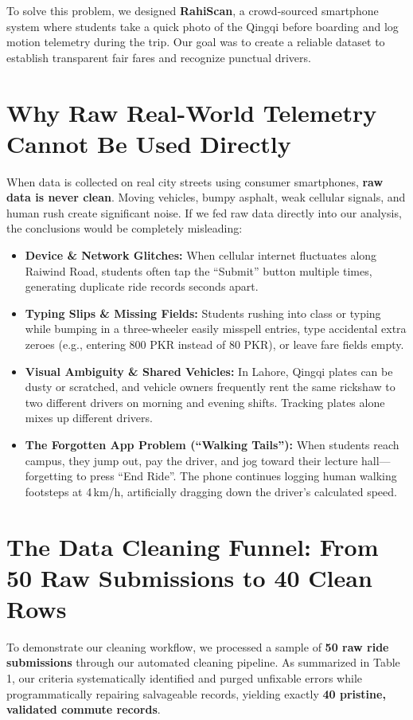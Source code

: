 \documentclass[10pt, a4paper]{article}
\begin{document}
To solve this problem, we designed \textbf{RahiScan}, a crowd-sourced smartphone system where students take a quick photo of the Qingqi before boarding and log motion telemetry during the trip. Our goal was to create a reliable dataset to establish transparent fair fares and recognize punctual drivers.

\section{Why Raw Real-World Telemetry Cannot Be Used Directly}

When data is collected on real city streets using consumer smartphones, \textbf{raw data is never clean}. Moving vehicles, bumpy asphalt, weak cellular signals, and human rush create significant noise. If we fed raw data directly into our analysis, the conclusions would be completely misleading:
\begin{itemize}\setlength{\itemsep}{1.2pt}\setlength{\parskip}{0pt}
  \item \textbf{Device \& Network Glitches:} When cellular internet fluctuates along Raiwind Road, students often tap the ``Submit'' button multiple times, generating duplicate ride records seconds apart.
  \item \textbf{Typing Slips \& Missing Fields:} Students rushing into class or typing while bumping in a three-wheeler easily misspell entries, type accidental extra zeroes (e.g., entering 800 PKR instead of 80 PKR), or leave fare fields empty.
  \item \textbf{Visual Ambiguity \& Shared Vehicles:} In Lahore, Qingqi plates can be dusty or scratched, and vehicle owners frequently rent the same rickshaw to two different drivers on morning and evening shifts. Tracking plates alone mixes up different drivers.
  \item \textbf{The Forgotten App Problem (``Walking Tails''):} When students reach campus, they jump out, pay the driver, and jog toward their lecture hall---forgetting to press ``End Ride''. The phone continues logging human walking footsteps at 4\,km/h, artificially dragging down the driver's calculated speed.
\end{itemize}

\section{The Data Cleaning Funnel: From 50 Raw Submissions to 40 Clean Rows}

To demonstrate our cleaning workflow, we processed a sample of \textbf{50 raw ride submissions} through our automated cleaning pipeline. As summarized in Table 1, our criteria systematically identified and purged unfixable errors while programmatically repairing salvageable records, yielding exactly \textbf{40 pristine, validated commute records}.
\end{document}

